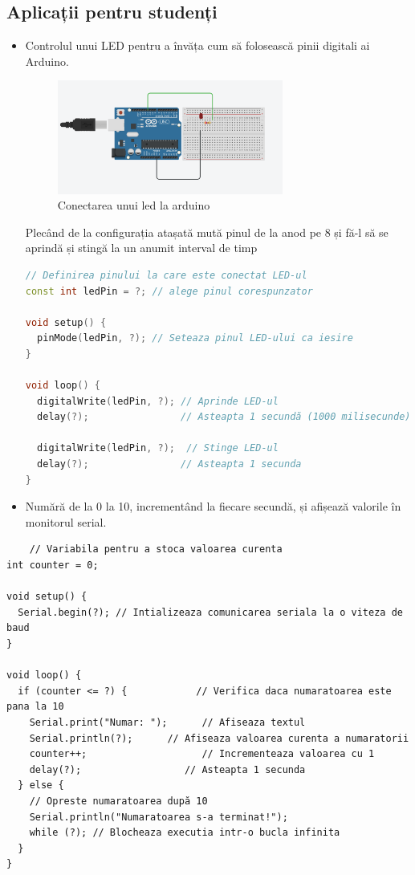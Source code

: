 \documentclass{report}
\begin{document}
\subsection*{Aplicații pentru studenți}
\begin{itemize}
    \item Controlul unui LED pentru a învăța cum să folosească pinii digitali ai Arduino.

    \begin{figure}[H]
    \centering
    \includegraphics[width=0.7\textwidth]{led.png}
    \caption{Conectarea unui led la arduino}
    \label{fig:arduino}
\end{figure}
Plecând de la configurația atașată mută pinul de la anod pe 8 și fă-l să se aprindă și stingă la un anumit interval de timp

\begin{lstlisting}[language=C++]
// Definirea pinului la care este conectat LED-ul
const int ledPin = ?; // alege pinul corespunzator 

void setup() {
  pinMode(ledPin, ?); // Seteaza pinul LED-ului ca iesire
}

void loop() {
  digitalWrite(ledPin, ?); // Aprinde LED-ul
  delay(?);                // Asteapta 1 secundă (1000 milisecunde)

  digitalWrite(ledPin, ?);  // Stinge LED-ul
  delay(?);                // Asteapta 1 secunda
}


\end{lstlisting}
\newpage
\vspace*{1cm}
\item Numără de la 0 la 10, incrementând la fiecare secundă, și afișează valorile în monitorul serial.
\end{itemize}

\begin{lstlisting}
    // Variabila pentru a stoca valoarea curenta
int counter = 0;

void setup() {
  Serial.begin(?); // Intializeaza comunicarea seriala la o viteza de  baud
}

void loop() {
  if (counter <= ?) {            // Verifica daca numaratoarea este pana la 10
    Serial.print("Numar: ");      // Afiseaza textul
    Serial.println(?);      // Afiseaza valoarea curenta a numaratorii
    counter++;                    // Incrementeaza valoarea cu 1
    delay(?);                  // Asteapta 1 secunda
  } else {
    // Opreste numaratoarea după 10
    Serial.println("Numaratoarea s-a terminat!");
    while (?); // Blocheaza executia intr-o bucla infinita
  }
}

\end{lstlisting}
\end{document}
